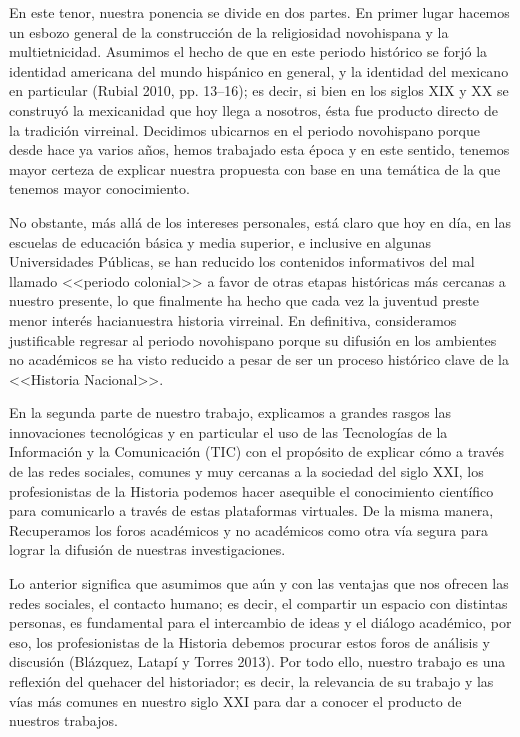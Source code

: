 En este tenor, nuestra ponencia se divide en dos partes. En primer lugar hacemos
un esbozo general de la construcción de la religiosidad novohispana y la
multietnicidad. Asumimos el hecho de que  en este periodo histórico se forjó la
identidad americana del mundo hispánico en general, y la identidad del mexicano
en particular (Rubial 2010, pp. 13--16); es decir, si bien en los siglos XIX y XX
se construyó la mexicanidad que hoy llega a nosotros, ésta fue producto directo
de la tradición virreinal. Decidimos ubicarnos en el periodo novohispano porque
desde hace ya varios años, hemos trabajado esta época y en este sentido,
tenemos mayor certeza de explicar nuestra propuesta con base en una temática de
la que tenemos mayor conocimiento. 

 
No obstante, más allá de los intereses personales, está claro  que hoy en día,
en las escuelas de educación básica y media superior, e inclusive en algunas
Universidades Públicas, se han reducido los contenidos informativos del mal
llamado <<periodo colonial>> a favor de otras etapas históricas más cercanas a
nuestro presente, lo que finalmente ha hecho que cada vez la juventud preste
menor interés hacia\linebreak nuestra historia virreinal. En definitiva, consideramos
justificable regresar al periodo novohispano porque su difusión en los
ambientes no académicos se ha visto reducido a pesar de ser un proceso
histórico clave de la <<Historia Nacional>>.


En la segunda parte de nuestro trabajo, explicamos a grandes rasgos las
innovaciones tecnológicas y en particular el uso de las Tecnologías de la
Información y la Comunicación (TIC) con el propósito de explicar cómo a través
de las redes sociales, comunes y muy cercanas a la sociedad del siglo XXI, los
profesionistas de la Historia podemos hacer asequible el conocimiento científico
para comunicarlo a través de estas plataformas virtuales. De la misma manera,
Recuperamos los foros académicos y no académicos como otra vía segura para
lograr la difusión de nuestras investigaciones. 

Lo anterior significa que asumimos que aún y con las ventajas que nos ofrecen
las redes sociales, el contacto humano; es decir, el compartir un espacio con
distintas personas, es fundamental para el intercambio de ideas y el diálogo
académico, por eso, los profesionistas de la Historia debemos procurar estos
foros de análisis y discusión (Blázquez, Latapí y Torres 2013). Por todo ello,
nuestro trabajo es una reflexión del quehacer del historiador; es decir, la
relevancia de su trabajo y las vías más comunes en nuestro siglo XXI para dar a
conocer el producto de nuestros trabajos. 


